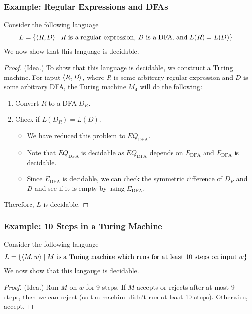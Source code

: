 \documentclass[letterpaper]{article}
\begin{document}
\subsubsection{Example: Regular Expressions and DFAs}
Consider the following language 
\[L = \{\langle R, D \rangle \mid R \text{ is a regular expression, } D \text{ is a DFA, and } L(R) = L(D)\}\]
We now show that this language is decidable. 
\begin{mdframed}[]
    \begin{proof}
        (Idea.) To show that this language is decidable, we construct a Turing machine. For input $\langle R, D \rangle$, where $R$ is some arbitrary regular expression and $D$ is some arbitrary DFA, the Turing machine $M_4$ will do the following: 
        \begin{enumerate}
            \item Convert $R$ to a DFA $D_R$. 
            \item Check if $L(D_R) = L(D)$. 
            \begin{itemize}
                \item We have reduced this problem to $EQ_{\text{DFA}}$. 
                \item Note that $EQ_{\text{DFA}}$ is decidable as $EQ_{\text{DFA}}$ depends on $E_{\text{DFA}}$ and $E_{\text{DFA}}$ is decidable. 
                \item Since $E_{\text{DFA}}$ is decidable, we can check the symmetric difference of $D_R$ and $D$ and see if it is empty by using $E_{\text{DFA}}$. 
            \end{itemize}
        \end{enumerate}
        Therefore, $L$ is decidable. 
    \end{proof}
\end{mdframed}

\subsubsection{Example: 10 Steps in a Turing Machine}
Consider the following language 
\[L = \{\langle M, w \rangle \mid M \text{ is a Turing machine which runs for at least 10 steps on input } w\}\]
We now show that this langauge is decidable.
\begin{mdframed}[]
    \begin{proof}
        (Idea.) Run $M$ on $w$ for 9 steps. If $M$ accepts or rejects after at most 9 steps, then we can reject (as the machine didn't run at least 10 steps). Otherwise, accept. 
    \end{proof}
\end{mdframed}
\end{document}
